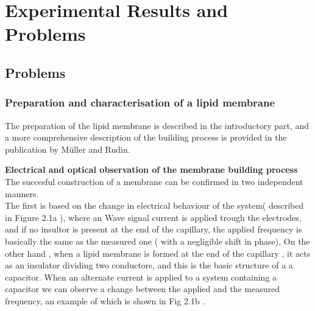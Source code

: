 \documentclass[a4paper,english,12pt,bibliography=totoc]{scrreprt}
\begin{document}

\chapter{Experimental Results  and Problems}
\label{cha:Experiment}
\section{Problems}

\subsection{Preparation and characterisation of a lipid membrane}

The preparation of the lipid membrane is described in the introductory part, and a more comprehensive description of the building process is provided in the publication by Müller and Rudin. \cite{mueller1962reconstitution}


\textbf{Electrical and optical observation of the membrane building process}
The succesful construction of a membrane can be confirmed in two independent manners.\\
The first is based on the change in electrical behaviour of the system( described in Figure 2.1a ), where an Wave signal current is applied trough the electrodes, and if no insultor is present at the end of the capillary, the applied frequency is basically the same as the measured one ( with a negligible shift in phase), On the other hand , when a lipid membrane is formed at the end of the capillary , it acts as an insulator dividing two conductors, and this is the basic structure of a  a capacitor. When an alternate current is applied to a system containing a capacitor we can observe a change between the applied and the measured frequency, an example of which is shown in Fig 2.1b .
\end{document}
